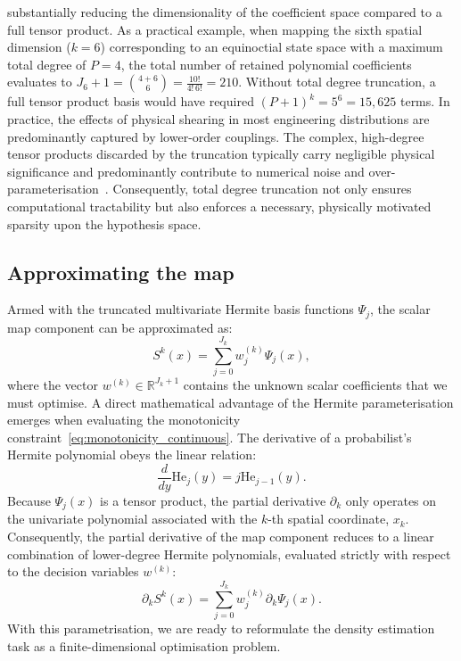 substantially reducing the dimensionality of the coefficient space compared to a full tensor product. As a practical example, when mapping the sixth spatial dimension ($k=6$) corresponding to an equinoctial state space with a maximum total degree of $P=4$, the total number of retained polynomial coefficients evaluates to $J_6 + 1 = \binom{4 + 6}{6} = \frac{10!}{4! \, 6!} = 210$. Without total degree truncation, a full tensor product basis would have required $(P+1)^k = 5^6 = 15,625$ terms. In practice, the effects of physical shearing in most engineering distributions are predominantly captured by lower-order couplings. The complex, high-degree tensor products discarded by the truncation typically carry negligible physical significance and predominantly contribute to numerical noise and over-parameterisation~\cite{Baptista2022}. Consequently, total degree truncation not only ensures computational tractability but also enforces a necessary, physically motivated sparsity upon the hypothesis space.

\subsection{Approximating the map} \label{subsec:hermite_map_approximation}

Armed with the truncated multivariate Hermite basis functions $\Psi_j$, the scalar map component can be approximated as:
\begin{equation}
    S^k(x) = \sum_{j=0}^{J_k} w_j^{(k)} \Psi_j(x),
    \label{eq:hermite_expansion}
\end{equation}
where the vector $w^{(k)} \in \mathbb{R}^{J_k+1}$ contains the unknown scalar coefficients that we must optimise. A direct mathematical advantage of the Hermite parameterisation emerges when evaluating the monotonicity constraint~\eqref{eq:monotonicity_continuous}. The derivative of a probabilist's Hermite polynomial obeys the linear relation:
\begin{equation*}
    \frac{d}{dy} \mathrm{He}_j(y) = j \mathrm{He}_{j-1}(y).
    \label{eq:hermite_derivative}
\end{equation*}
Because $\Psi_j(x)$ is a tensor product, the partial derivative $\partial_k$ only operates on the univariate polynomial associated with the $k$-th spatial coordinate, $x_k$. Consequently, the partial derivative of the map component reduces to a linear combination of lower-degree Hermite polynomials, evaluated strictly with respect to the decision variables $w^{(k)}$:
\begin{equation}
    \partial_k S^k(x) = \sum_{j=0}^{J_k} w_j^{(k)} \partial_k \Psi_j(x).
    \label{eq:map_derivative_linear}
\end{equation}
With this parametrisation, we are ready to reformulate the density estimation task as a finite-dimensional optimisation problem.